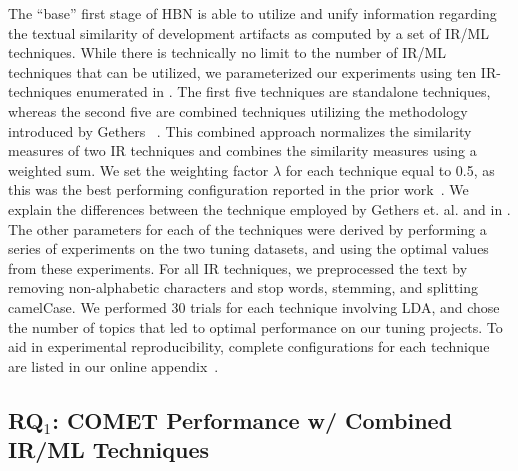 The ``base'' first stage of \Comets HBN is able to utilize and unify information regarding the textual similarity of development artifacts as computed by a set of IR/ML techniques.  While there is technically no limit to the number of IR/ML techniques that can be utilized, we parameterized our experiments using ten IR-techniques enumerated in . The first five techniques are standalone techniques, whereas the second five are combined techniques utilizing the methodology introduced by Gethers \etal~\citep{Gethers:ICSM'11}. This combined approach normalizes the similarity measures of two IR techniques and combines the similarity measures using a weighted sum. We set the weighting factor $\lambda$ for each technique equal to 0.5, as this was the best performing configuration reported in the prior work~\citep{Gethers:ICSM'11}. We explain the differences between the technique employed by Gethers et. al. and \Comet in . The other parameters for each of the techniques were derived by performing a series of experiments on the two tuning datasets, and using the optimal values from these experiments. For all IR techniques, we preprocessed the text by removing non-alphabetic characters and stop words, stemming, and splitting camelCase. We performed 30 trials for each technique involving LDA, and chose the number of topics that led to optimal performance on our tuning projects. To aid in experimental reproducibility, complete configurations for each technique are listed in our online appendix~\citep{appendix}.




\subsection{RQ$_1$: C{\footnotesize OMET} Performance w/ Combined IR/ML Techniques}
\label{sub:study-rq1}

